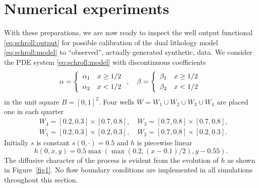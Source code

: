 \section{Numerical experiments}

With these preparations, we are now ready to inspect the well output
functional \eqref{eq:schroll:output} for possible calibration of
the dual lithology model \eqref{eq:schroll:model} to ``observed'',
actually generated synthetic, data.  We consider the PDE system
\eqref{eq:schroll:model} with discontinuous coefficients
\begin{equation}
 \alpha = \left\{
 \begin{array}{rl} \alpha_1 & x \ge 1/2 \\[\jot] \alpha_2 & x < 1/2 \end{array}
 \right .,
 \quad
 \beta = \left\{
 \begin{array}{rl} \beta_1 & x \ge 1/2 \\[\jot] \beta_2 & x < 1/2 \end{array}
 \right .
\end{equation}
in the unit square $B=[0,1]^2$.  Four wells $W = W_1 \cup W_2 \cup W_3
\cup W_4$ are placed one in each quarter
\begin{align}
 &W_4 = [0.2, 0.3] \times [0.7, 0.8], \quad
 W_3 = [0.7, 0.8] \times [0.7, 0.8],
\\
 &W_1 = [0.2, 0.3] \times [0.2, 0.3], \quad
 W_2 = [0.7, 0.8] \times [0.2, 0.3].
\end{align}
Initially $s$ is constant $s(0,\cdot)=0.5$ and $h$ is piecewise linear
\begin{equation}
 h(0,x,y) = 0.5 \max(\max(0.2, (x-0.1)/2), y-0.55) .
\end{equation}
The diffusive character of the process is evident from the evolution
of $h$ as shown in Figure~\ref{fig1}.  No flow boundary conditions are
implemented in all simulations throughout this section.

